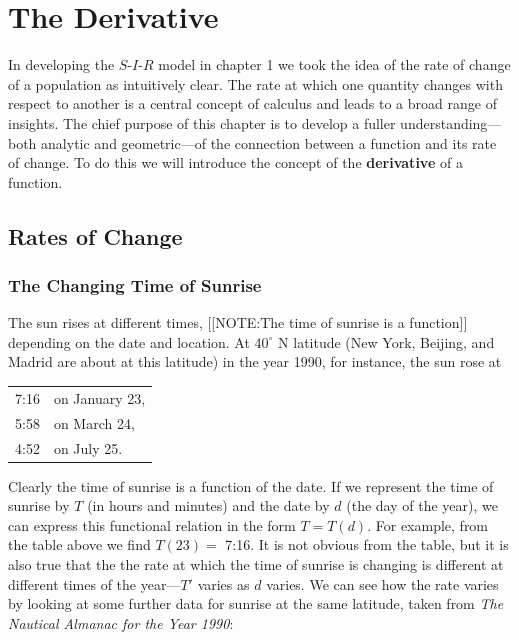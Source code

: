 
\chapter{The Derivative}
\label{chap:the-derivative}


In developing the $S$-$I$-$R$ model in chapter 1 we took the idea of
the rate of change of a population as intuitively clear.  The rate at
which one quantity changes with respect to another is a central
concept of calculus and leads to a broad range of insights.  The chief
purpose of this chapter is to develop a fuller understanding---both
analytic and geometric---of the connection between a function and its
rate of change.  To do this we will introduce the concept of the {\bf
  derivative} of a function.


\section{Rates of Change}
\label{sec:rates-of-change}

\subsection{The Changing Time of Sunrise}
\label{subsec:the-changing-time-of-sunrise}

The sun rises at different times, 
[[NOTE:The time of sunrise  is a function]]
depending on the date and location.  At $40^\circ$ N latitude (New
York, Beijing, and Madrid are about at this latitude) in the year
1990, for instance, the sun rose at
\begin{center}


\begin{tabular}{ll} 	
	7:16 &	on January 23, \\	
	5:58 &	on March 24,   \\	
	4:52 &	on July 25.  
\end{tabular}

\end{center}
Clearly the time of sunrise is a function of the date.  If we
represent the time of sunrise by $T$ (in hours and minutes) and the
date by $d$ (the day of the year), we can express this functional
relation in the form $T = T(d)$.  For example, from the table above we
find $T(23) =$ 7:16.  It is not obvious from the table, but it is also
true that the the rate at which the time of sunrise is changing is
different at different times of the year---$T'$ varies as $d$ varies.
We can see how the rate varies by looking at some further data for
sunrise at the same latitude, taken from {\em The Nautical Almanac for
  the Year 1990\/}:\label{'table'}



